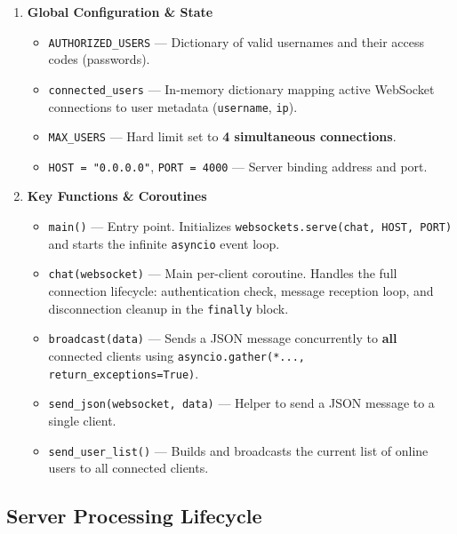 \documentclass[11pt,a4paper]{article}
\begin{document}
\begin{enumerate}[leftmargin=*, itemsep=4pt]

    \item \textbf{Global Configuration \& State}
    \begin{itemize}[itemsep=2pt]
        \item \texttt{AUTHORIZED\_USERS} --- Dictionary of valid usernames and their access codes (passwords).
        \item \texttt{connected\_users} --- In-memory dictionary mapping active WebSocket connections to user metadata (\texttt{username}, \texttt{ip}).
        \item \texttt{MAX\_USERS} --- Hard limit set to \textbf{4 simultaneous connections}.
        \item \texttt{HOST = "0.0.0.0"}, \texttt{PORT = 4000} --- Server binding address and port.
    \end{itemize}

    \item \textbf{Key Functions \& Coroutines}
    \begin{itemize}[itemsep=2pt]
        \item \texttt{main()} --- Entry point. Initializes \texttt{websockets.serve(chat, HOST, PORT)} and starts the infinite \texttt{asyncio} event loop.
        \item \texttt{chat(websocket)} --- Main per-client coroutine. Handles the full connection lifecycle: authentication check, message reception loop, and disconnection cleanup in the \texttt{finally} block.
        \item \texttt{broadcast(data)} --- Sends a JSON message concurrently to \textbf{all} connected clients using \texttt{asyncio.gather(*..., return\_exceptions=True)}.
        \item \texttt{send\_json(websocket, data)} --- Helper to send a JSON message to a single client.
        \item \texttt{send\_user\_list()} --- Builds and broadcasts the current list of online users to all connected clients.
    \end{itemize}

\end{enumerate}

\subsection{Server Processing Lifecycle}
\end{document}
